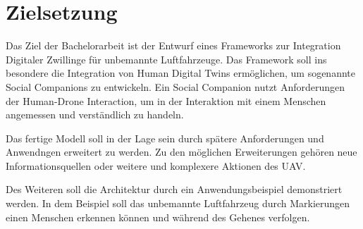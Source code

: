 \section{Zielsetzung}



Das Ziel der Bachelorarbeit ist der Entwurf eines Frameworks zur Integration Digitaler Zwillinge für unbemannte Luftfahrzeuge. 
Das Framework soll ins besondere die Integration von Human Digital Twins ermöglichen, um sogenannte Social Companions zu entwickeln.
Ein Social Companion nutzt Anforderungen der Human-Drone Interaction, um in der Interaktion mit einem Menschen angemessen und verständlich zu handeln.

Das fertige Modell soll in der Lage sein durch spätere Anforderungen und Anwendngen erweitert zu werden. Zu den möglichen Erweiterungen gehören neue Informationsquellen oder weitere und komplexere Aktionen des UAV.

Des Weiteren soll die Architektur durch ein Anwendungsbeispiel demonstriert werden. In dem Beispiel soll das unbemannte Luftfahrzeug durch Markierungen einen Menschen erkennen können und während des Gehenes verfolgen.